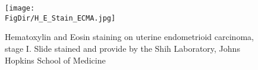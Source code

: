 \begin{figure}
  \centerline{\texttt{[image: \\FigDir/H\_E\_Stain\_ECMA.jpg]}}
  \caption{Hematoxylin and Eosin staining on uterine endometrioid carcinoma, stage I. Slide stained and provide by the Shih Laboratory, Johns Hopkins School of Medicine}
\label{fig:H_E_Stain_ECMA}
\end{figure}